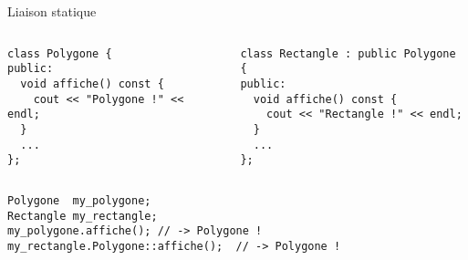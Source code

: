 \documentclass[c]{beamer}
\begin{document}
\begin{frame}[fragile]{Liaison statique}

\begin{columns}
\begin{column}{0.5\columnwidth}
\begin{verbatim}
class Polygone {
public:
  void affiche() const {
    cout << "Polygone !" << endl;
  }
  ...
};
\end{verbatim}
\end{column}
\begin{column}{0.5\columnwidth}
\begin{verbatim}
class Rectangle : public Polygone {
public:
  void affiche() const {
    cout << "Rectangle !" << endl;
  }
  ...
};
\end{verbatim}
\end{column}
\end{columns}

\vspace{1em}

\begin{columns}
\begin{column}{0.5\columnwidth}
\begin{verbatim}
Polygone  my_polygone;
Rectangle my_rectangle;
my_polygone.affiche(); // -> Polygone !
my_rectangle.Polygone::affiche();  // -> Polygone !
\end{verbatim}
\end{column}
\end{columns}
\vspace{5em}
\end{frame}

\end{document}
